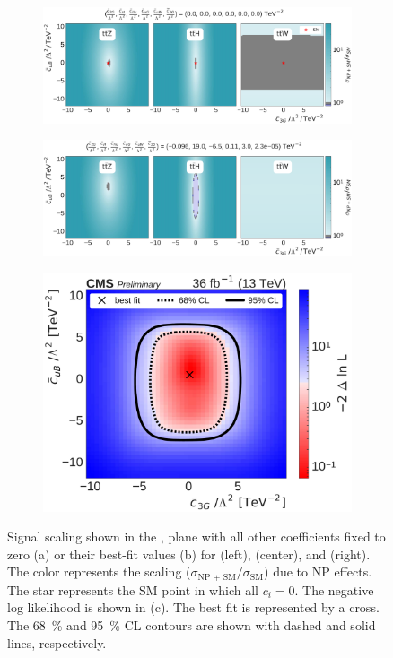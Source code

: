 \begin{figure}
  \vspace{-1cm}
  \begin{subfigure}{\linewidth}
    \centering
    \includegraphics[width=\linewidth]{figures/thirteen-TeV/scaling-frozen/c3G_cuB}
    \caption{}
  \end{subfigure}
  \begin{subfigure}{\linewidth}
    \centering
    \includegraphics[width=\linewidth]{figures/thirteen-TeV/scaling/c3G_cuB}
    \caption{}
  \end{subfigure}
  \begin{subfigure}{\linewidth}
    \centering
    \includegraphics[width=0.6\linewidth]{figures/thirteen-TeV/nll/c3G_cuB}
    \caption{}
  \end{subfigure}
  \vspace{-1cm}
  \setlength{\capwidth}{15cm}
  \caption[Signal scaling and profile likelihood scan in the \cthreeG, \cuB plane]{Signal scaling
  shown in the \cthreeG, \cuB plane with all other coefficients fixed to zero (a) or their best-fit
  values (b) for \ttZ (left), \ttH (center), and \ttW (right). The color represents the scaling
  ($\sigma_\text{NP + SM} / \sigma_\text{SM}$) due to NP effects. The star represents the SM point in
  which all $c_i=0$. The negative log likelihood is shown in (c). The best fit is represented by a
  cross. The \SI{68}{\percent} and \SI{95}{\percent} CL contours are shown with dashed and solid
  lines, respectively.}
\end{figure}

